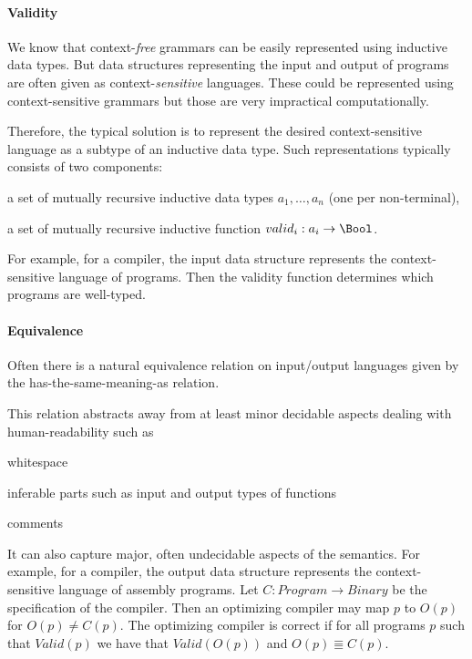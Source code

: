 \paragraph{Validity}
We know that context-\emph{free} grammars can be easily represented using inductive data types.
But data structures representing the input and output of programs are often given as context-\emph{sensitive} languages.
These could be represented using context-sensitive grammars but those are very impractical computationally.

Therefore, the typical solution is to represent the desired context-sensitive language as a subtype of an inductive data type.
Such representations typically consists of two components:
\begin{compactitem}
 \item a set of mutually recursive inductive data types $a_1,\ldots,a_n$ (one per non-terminal),
 \item a set of mutually recursive inductive function $valid_i:a_i\to\Bool$.
\end{compactitem}

For example, for a compiler, the input data structure represents the context-sensitive language of programs.
Then the validity function determines which programs are well-typed.

\paragraph{Equivalence}
Often there is a natural equivalence relation on input/output languages given by the has-the-same-meaning-as relation.

This relation abstracts away from at least minor decidable aspects dealing with human-readability such as
\begin{compactitem}
 \item whitespace
 \item inferable parts such as input and output types of functions
 \item comments
\end{compactitem}

It can also capture major, often undecidable aspects of the semantics.
For example, for a compiler, the output data structure represents the context-sensitive language of assembly programs.
Let $C:Program\to Binary$ be the specification of the compiler.
Then an optimizing compiler may map $p$ to $O(p)$ for $O(p)\neq C(p)$.
The optimizing compiler is correct if  for all programs $p$ such that $Valid(p)$ we have that $Valid(O(p))$ and $O(p)\Equiv C(p)$.

